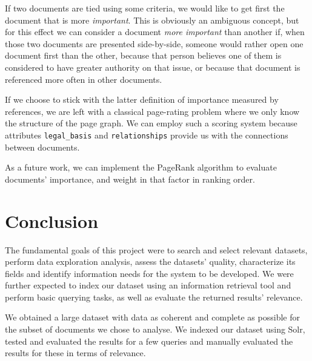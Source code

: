 \documentclass[sigconf, authorversion]{acmart}
\let\mainabsdir\theabsdir %
\begin{document}
If two documents are tied using some criteria, we would like to get first the document that is more \textit{important}. This is obviously an ambiguous concept, but for this effect we can consider a document \textit{more important} than another if, when those two documents are presented side-by-side, someone would rather open one document first than the other, because that person believes one of them is considered to have greater authority on that issue, or because that document is referenced more often in other documents.

If we choose to stick with the latter definition of importance measured by references, we are left with a classical page-rating problem where we only know the structure of the page graph. We can employ such a scoring system because attributes \texttt{legal\_basis} and \texttt{relationships} provide us with the connections between documents.

As a future work, we can implement the PageRank algorithm to evaluate documents' importance, and weight in that factor in ranking order.

\section{Conclusion}

The fundamental goals of this project were to search and select relevant datasets, perform data exploration analysis, assess the datasets' quality, characterize its fields and identify information needs for the system to be developed. We were further expected to index our dataset using an information retrieval tool and perform basic querying tasks, as well as evaluate the returned results' relevance.

We obtained a large dataset with data as coherent and complete as possible for the subset of documents we chose to analyse. We indexed our dataset using Solr, tested and evaluated the results for a few queries and manually evaluated the results for these in terms of relevance.



\end{document}
